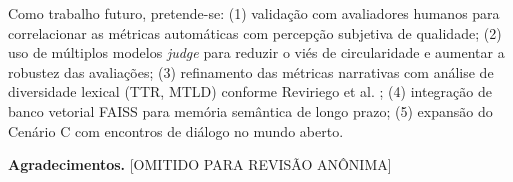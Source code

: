\documentclass[12pt]{article}
\begin{document}
Como trabalho futuro, pretende-se: (1) validação com avaliadores humanos para correlacionar as métricas automáticas com percepção subjetiva de qualidade; (2) uso de múltiplos modelos \textit{judge} para reduzir o viés de circularidade e aumentar a robustez das avaliações; (3) refinamento das métricas narrativas com análise de diversidade lexical (TTR, MTLD) conforme Reviriego et al. \cite{reviriego:2024}; (4) integração de banco vetorial FAISS para memória semântica de longo prazo; (5) expansão do Cenário C com encontros de diálogo no mundo aberto.

\textbf{Agradecimentos.} [OMITIDO PARA REVISÃO ANÔNIMA]



\end{document}
